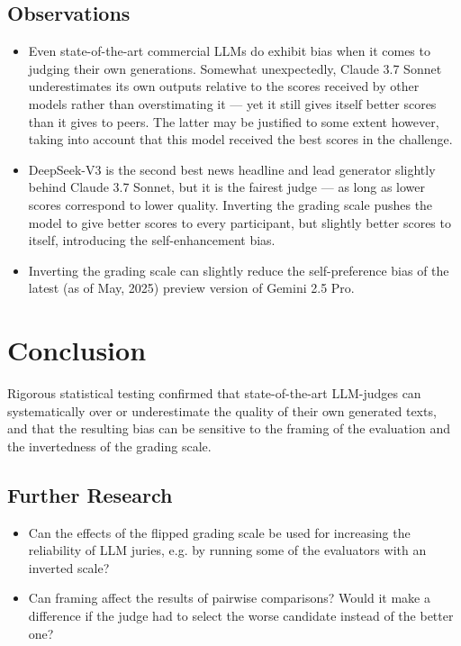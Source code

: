 \documentclass[noindent,nohyp,parspace,titlepage,twoside,12pt]{article}
\begin{document}
    \subsection{Observations}

      \begin{itemize}
        \item Even state-of-the-art commercial LLMs do exhibit bias when it
              comes to judging their own generations. Somewhat unexpectedly,
              Claude 3.7 Sonnet underestimates its own outputs relative to the
              scores received by other models rather than overstimating it ---
              yet it still gives itself better scores than it gives to peers.
              The latter may be justified to some extent however, taking into
              account that this model received the best scores in the
              challenge.

        \item DeepSeek-V3 is the second best news headline and lead generator
              slightly behind Claude 3.7 Sonnet, but it is the fairest judge
              --- as long as lower scores correspond to lower quality. Inverting
              the grading scale pushes the model to give better scores to every
              participant, but slightly better scores to itself, introducing the
              self-enhancement bias.

        \item Inverting the grading scale can slightly reduce the
              self-preference bias of the latest (as of May, 2025) preview
              version of Gemini 2.5 Pro.
      \end{itemize}

  \section{Conclusion}

    Rigorous statistical testing confirmed that state-of-the-art LLM-judges can
    systematically over or underestimate the quality of their own generated
    texts, and that the resulting bias can be sensitive to the framing of the
    evaluation and the invertedness of the grading scale.

    \subsection{Further Research}

      \begin{itemize}
        \item Can the effects of the flipped grading scale be used for
              increasing the reliability of LLM juries, e.g. by running some of
              the evaluators with an inverted scale?

        \item Can framing affect the results of pairwise comparisons? Would it
              make a difference if the judge had to select the worse candidate
              instead of the better one?
      \end{itemize}
\end{document}
